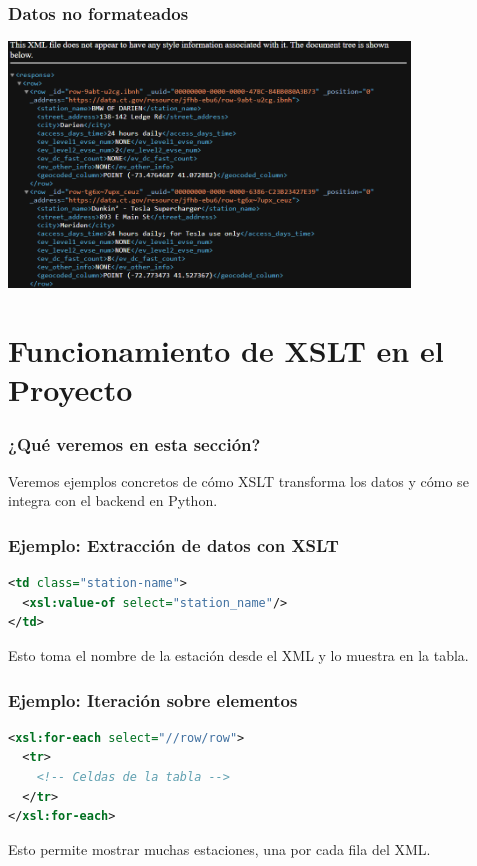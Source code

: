\documentclass{beamer}
\begin{document}
  \begin{frame}
  \frametitle{Datos no formateados}
  \begin{center}
  \includegraphics[width=0.8\textwidth]{Imagenes/Datos.png} %
  \end{center}
  \end{frame}

\section{Funcionamiento de XSLT en el Proyecto}

\begin{frame}
\frametitle{¿Qué veremos en esta sección?}
Veremos ejemplos concretos de cómo XSLT transforma los datos y cómo se integra con el backend en Python.
\end{frame}

\begin{frame}[fragile]
\frametitle{Ejemplo: Extracción de datos con XSLT}
\begin{lstlisting}[language=XML]
<td class="station-name">
  <xsl:value-of select="station_name"/>
</td>
\end{lstlisting}
Esto toma el nombre de la estación desde el XML y lo muestra en la tabla.
\end{frame}

\begin{frame}[fragile]
\frametitle{Ejemplo: Iteración sobre elementos}
\begin{lstlisting}[language=XML]
<xsl:for-each select="//row/row">
  <tr>
    <!-- Celdas de la tabla -->
  </tr>
</xsl:for-each>
\end{lstlisting}
Esto permite mostrar muchas estaciones, una por cada fila del XML.
\end{frame}
\end{document}
